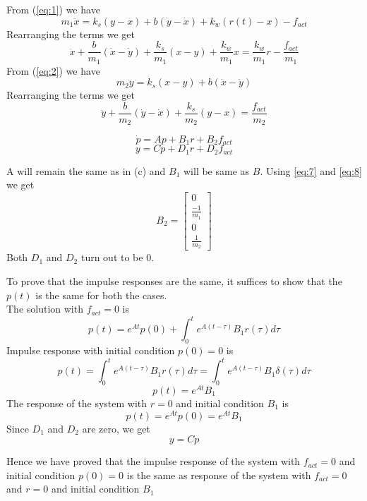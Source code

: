 \documentclass{article}
\newenvironment{answer}[2][Answer]{\begin{trivlist}
  \item[\hskip \labelsep {\bfseries #1}\hskip \labelsep {\bfseries #2:}]}{\end{trivlist}}
\begin{document}
\begin{answer}e
  From (\ref{eq:1}) we have
  $$m_1\ddot{x} = k_s(y-x) + b(\dot{y} - \dot{x}) + k_w(r(t) - x) - f_{act}$$
  Rearranging the terms we get
  \begin{equation}
    \label{eq:7}
    \ddot{x} + \frac{b}{m_1}(\dot{x} - \dot{y}) + \frac{k_s}{m_1}(x - y) + \frac{k_w}{m_1}x = \frac{k_w}{m_1}r - \frac{f_{act}}{m_1}
  \end{equation}
  From (\ref{eq:2}) we have
  $$m_2\ddot{y} = k_s(x-y) + b(\dot{x} - \dot{y})$$
  Rearranging the terms we get
  \begin{equation}
    \label{eq:8}
    \ddot{y} + \frac{b}{m_2}(\dot{y} - \dot{x}) + \frac{k_s}{m_2}(y - x) = \frac{f_{act}}{m_2}
  \end{equation}

\end{answer}
\begin{answer}f
  $$\dot{p} = Ap + B_1r + B_2f_{act}$$
  $$ y = Cp + D_1r + D_2f_{act}$$

  A will remain the same as in (c) and $B_1$ will be same as $B$.
  Using \ref{eq:7} and \ref{eq:8} we get
  \[
    B_2 =
    \begin{bmatrix}
      0\\
      \frac{-1}{m_1}\\
      0\\
      \frac{1}{m_2}
    \end{bmatrix}
  \]
  Both $D_1$ and $D_2$ turn out to be 0.  
\end{answer}
\begin{answer}g
  To prove that the impulse responses are the same, it suffices to show that the $p(t)$ is the same for both the cases. \\
  The solution with $f_{act} = 0$ is
  $$p(t) = e^{At}p(0) + \int_0^t e^{A(t-\tau)}B_1r(\tau)d\tau$$
  Impulse response with initial condition $p(0) = 0$ is
  $$p(t) = \int_0^t e^{A(t-\tau)}B_1r(\tau)d\tau = \int_0^t e^{A(t-\tau)}B_1\delta(\tau)d\tau$$
  $$p(t) = e^{At}B_1$$
  The response of the system with $r = 0$ and initial condition $B_1$ is
  $$p(t) = e^{At}p(0) = e^{At}B_1$$
  Since $D_1$ and $D_2$ are zero, we get
  $$y = Cp$$
  
  Hence we have proved that the impulse response of the system with $f_{act} = 0$ and initial condition $p(0)=0$ is the same as response of the system with $f_{act} = 0$ and $r=0$ and initial condition $B_1$
\end{answer}
\end{document}
